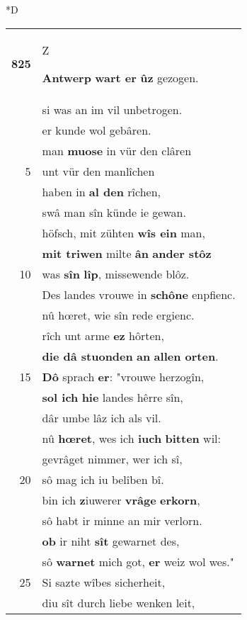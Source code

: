 \documentclass[8pt,a4paper,notitlepage]{article}
\begin{document}
\begin{table}[ht]
\begin{minipage}[t]{0.5\linewidth}
\small
\begin{center}*D
\end{center}
\begin{tabular}{rl}
\textbf{825} & \begin{large}Z\end{large}\textbf{Antwerp} \textbf{wart er} \textbf{ûz} gezogen.\\ 
 & si was an im vil unbetrogen.\\ 
 & er kunde wol gebâren.\\ 
 & man \textbf{muose} in vür den clâren\\ 
5 & unt vür den manlîchen\\ 
 & haben in \textbf{al den} rîchen,\\ 
 & swâ man sîn künde ie gewan.\\ 
 & höfsch, mit zühten \textbf{wîs ein} man,\\ 
 & \textbf{mit triwen} milte \textbf{ân} \textbf{ander stôz}\\ 
10 & was \textbf{sîn} \textbf{lîp}, missewende blôz.\\ 
 & Des landes vrouwe in \textbf{schône} enpfienc.\\ 
 & nû hœret, wie sîn rede ergienc.\\ 
 & rîch unt arme \textbf{ez} hôrten,\\ 
 & \textbf{die dâ stuonden} \textbf{an} \textbf{allen orten}.\\ 
15 & \textbf{Dô} sprach \textbf{er}: "vrouwe herzogîn,\\ 
 & \textbf{sol ich} \textbf{hie} landes hêrre sîn,\\ 
 & dâr umbe lâz ich als vil.\\ 
 & nû \textbf{hœret}, wes ich \textbf{iuch} \textbf{bitten} wil:\\ 
 & gevrâget nimmer, wer ich sî,\\ 
20 & sô mag ich iu belîben bî.\\ 
 & bin ich \textbf{z}iuwerer \textbf{vrâge} \textbf{erkorn},\\ 
 & sô habt ir minne an mir verlorn.\\ 
 & \textbf{ob} ir niht \textbf{sît} gewarnet des,\\ 
 & sô \textbf{warnet} mich got, \textbf{er} weiz wol wes."\\ 
25 & Si sazte wîbes sicherheit,\\ 
 & diu sît durch liebe wenken leit,\\ 

\end{tabular}
\end{minipage}
\end{table}
\end{document}
